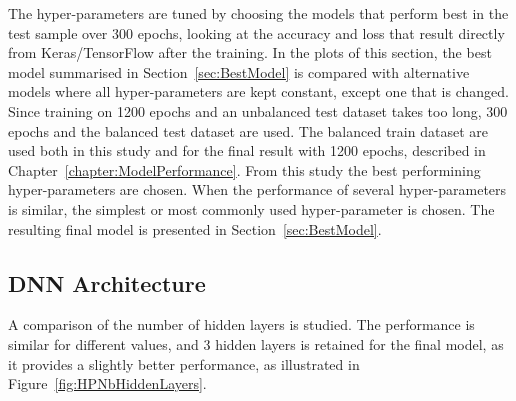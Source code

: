 The hyper-parameters are tuned by choosing the models that perform best in the test sample over 300 epochs, looking at the accuracy and loss that result directly from Keras/TensorFlow after the training. In the plots of this section, the best model summarised in Section~\ref{sec:BestModel} is compared with alternative models where all hyper-parameters are kept constant, except one that is changed. Since training on 1200 epochs and an unbalanced test dataset takes too long, 300 epochs and the balanced test dataset are used. The balanced train dataset are used both in this study and for the final result with 1200 epochs, described in Chapter~\ref{chapter:ModelPerformance}. From this study the best performining hyper-parameters are chosen. When the performance of several hyper-parameters is similar, the simplest or most commonly used hyper-parameter is chosen. The resulting final model is presented in Section~\ref{sec:BestModel}.

\subsection{DNN Architecture}
\label{sec:DNNArchitecture}

A comparison of the number of hidden layers is studied. The performance is similar for different values, and 3 hidden layers is retained for the final model, as it provides a slightly better performance, as illustrated in Figure~\ref{fig:HPNbHiddenLayers}.

